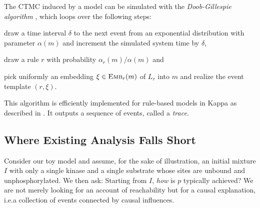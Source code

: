 The CTMC induced by a model can be simulated
with the \emph{Doob-Gillespie algorithm} \cite{gillespie1977exact},
which loops over the following steps:
\begin{inparaenum}[(1)]
\item draw a time interval $\delta$ to the next event from an
  exponential distribution with parameter $\alpha(m)$ and increment
  the simulated system time by $\delta$,
\item draw a rule $r$ with probability $\alpha_r(m)/\alpha(m)$ and
\item pick uniformly an embedding $\xi \in {\textsc{Emb}}_{r}(m)$ of $L_r$ into
  $m$ and realize the event template $(r, \xi)$.
\end{inparaenum}
This algorithm is efficiently implemented for rule-based models in
Kappa as described in
\cite{DanosEtAl-APLAS07,BoutillierEK17}. It outputs a sequence of events,
called a \emph{trace}.


\longversion{}

\subsection{Where Existing Analysis Falls Short}
\label{subsec:dumb-story}


Consider our toy model and assume, for the sake of illustration, an
initial mixture $I$ with only a single kinase and a single substrate
whose sites are unbound and unphosphorylated. We then ask: Starting
from $I$, \emph{how} is $p$ typically achieved? We are not merely
looking for an account of reachability but for a causal explanation,
i.e.\@ a collection of events connected by causal influences.

